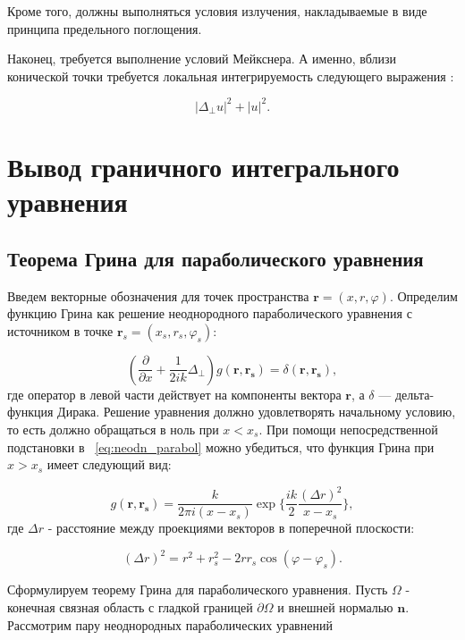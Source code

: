 Кроме того, должны выполняться условия излучения, накладываемые в виде принципа предельного поглощения.

Наконец, требуется выполнение условий Мейкснера. А именно, вблизи конической точки требуется локальная интегрируемость следующего выражения \cite{Shanin2017}:

\begin{equation}
|\Delta_\perp u|^2 + |u|^2.
\end{equation}

\section{Вывод граничного интегрального уравнения}

\subsection{Теорема Грина для параболического уравнения}
Введем векторные обозначения для точек пространства $\textbf{r} = (x, r, \varphi)$. Определим функцию Грина как решение неоднородного параболического уравнения с источником в точке $\textbf{r}_s = (x_s, r_s, \varphi_s)$:

\begin{equation}
\label{eq:neodn_parabol}
\left(\frac{\partial}{\partial x} + \frac{1}{2ik} \Delta_\perp \right) g(\mathbf{r}, \mathbf{r_s}) = \delta(\mathbf{r}, \mathbf{r_s}),
\end{equation}
где оператор в левой части действует на компоненты вектора $\textbf{r}$, а $\delta$ — дельта-функция Дирака. Решение уравнения должно удовлетворять начальному условию, то есть должно обращаться в ноль при $x < x_s$. При помощи непосредственной подстановки в ~\eqref{eq:neodn_parabol} можно убедиться, что функция Грина при $x>x_s$ имеет следующий вид:

\begin{equation}
g(\textbf{r}, \mathbf{r_s}) = \frac{k}{2 \pi i (x-x_s)} \exp \{\frac{ik}{2} \frac{(\Delta r)^2}{x-x_s} \},
\end{equation}
где $\Delta r$ - расстояние между проекциями векторов в поперечной плоскости:

\begin{equation}
(\Delta r)^2 = r^2 + r_s^2 - 2r r_s \cos(\varphi - \varphi_s).
\end{equation}

Сформулируем теорему Грина для параболического уравнения. Пусть $\Omega$ - конечная связная область с гладкой границей $\partial \Omega$  и внешней нормалью $\textbf{n}$. Рассмотрим пару неоднородных параболических уравнений

